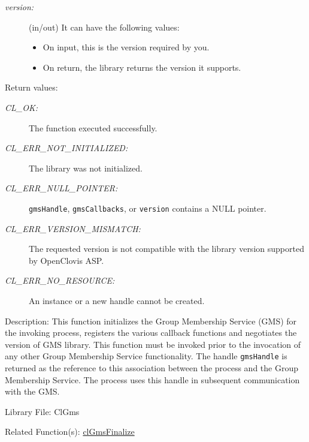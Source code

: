 \begin{flushleft}
\begin{Desc}
\begin{description}
\item[{\em version:}](in/out) It can have the following values: \begin{itemize}
\item On input, this is the version required by you. \item On return, the library returns the version it supports. \end{itemize}
\end{description}
\end{Desc}
\begin{Desc}
\item[Return values:]
\begin{description}
\item[{\em CL\_\-OK:}]The function executed successfully.
\item[{\em CL\_\-ERR\_\-NOT\_\-INITIALIZED:}]The library was not initialized.
\item[{\em CL\_\-ERR\_\-NULL\_\-POINTER:}]{\tt{gmsHandle}}, {\tt{gmsCallbacks}}, or {\tt{version}} contains a NULL pointer.
\item[{\em CL\_\-ERR\_\-VERSION\_\-MISMATCH:}]The requested version is not compatible with the library version supported by OpenClovis ASP.
\item[{\em CL\_\-ERR\_\-NO\_\-RESOURCE:}]An instance or a new handle cannot be created.\end{description}
\end{Desc}
\begin{Desc}
\item[Description:]This function initializes the Group Membership Service (GMS) for the invoking process, registers the various callback functions
and negotiates the version of GMS library. This function must be invoked prior to the invocation of any other Group Membership Service
functionality. The handle {\tt{gms\-Handle}} is returned as the reference to this association between the process and the Group Membership Service.
The process uses this handle in subsequent communication with the GMS.\end{Desc}
\begin{Desc}
\item[Library File:]Cl\-Gms\end{Desc}
\begin{Desc}
\item[Related Function(s):]\hyperlink{pagegms102}{cl\-Gms\-Finalize} \end{Desc}
\newpage



\end{flushleft}
